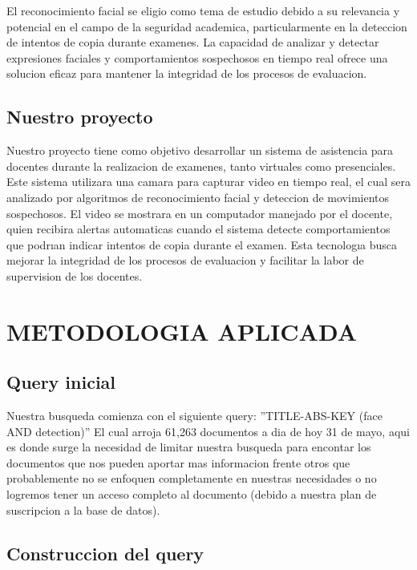 \documentclass[conference]{IEEEtran}
\begin{document}
El reconocimiento facial se eligio como tema de estudio
debido a su relevancia y potencial en el campo de la seguridad
academica, particularmente en la deteccion de intentos de
copia durante examenes. La capacidad de analizar y detectar
expresiones faciales y comportamientos sospechosos en tiempo real ofrece una solucion eficaz para mantener la integridad
de los procesos de evaluacion. 

\subsection{Nuestro proyecto}

Nuestro proyecto tiene como objetivo desarrollar un sistema
de asistencia para docentes durante la realizacion de examenes,
tanto virtuales como presenciales. Este sistema utilizara una
camara para capturar video en tiempo real, el cual sera
analizado por algoritmos de reconocimiento facial y deteccion
de movimientos sospechosos. El video se mostrara en un
computador manejado por el docente, quien recibira alertas
automaticas cuando el sistema detecte comportamientos que
podrıan indicar intentos de copia durante el examen. Esta
tecnologıa busca mejorar la integridad de los procesos de
evaluacion y facilitar la labor de supervision de los docentes. 

\section{METODOLOGIA APLICADA}
\subsection{ Query inicial}

Nuestra busqueda comienza con el siguiente query:
”TITLE-ABS-KEY (face AND detection)”
El cual arroja 61,263 documentos a dia de hoy 31 de mayo,
aqui es donde surge la necesidad de limitar nuestra busqueda
para encontar los documentos que nos pueden aportar mas
informacion frente otros que probablemente no se enfoquen
completamente en nuestras necesidades o no logremos tener
un acceso completo al documento (debido a nuestra plan de
suscripcion a la base de datos).



\subsection{Construccion del query}
\end{document}

